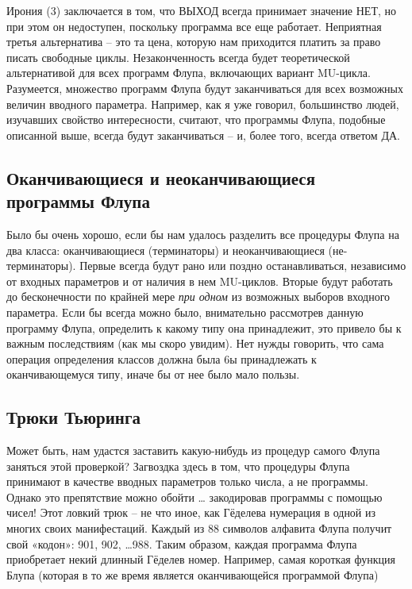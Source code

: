 \documentclass[../main.tex]{subfiles}
\begin{document}
Ирония (3) заключается в том, что ВЫХОД всегда принимает значение НЕТ, но при этом он недоступен, поскольку программа все еще работает. Неприятная третья альтернатива \--- это та цена, которую нам приходится платить за право писать свободные циклы. Незаконченность всегда будет теоретической альтернативой для всех программ Флупа, включающих вариант MU-цикла. Разумеется, множество программ Флупа будут заканчиваться для всех возможных величин вводного параметра. Например, как я уже говорил, большинство людей, изучавших свойство интересности, считают, что программы Флупа, подобные описанной выше, всегда будут заканчиваться \--- и, более того, всегда ответом ДА.


\subsection{Оканчивающиеся и неоканчивающиеся программы Флупа}

Было бы очень хорошо, если бы нам удалось разделить все процедуры Флупа на два класса: оканчивающиеся (терминаторы) и неоканчивающиеся (не-терминаторы). Первые всегда будут рано или поздно останавливаться, независимо от входных параметров и от наличия в нем MU-циклов. Вторые будут работать до бесконечности по крайней мере \emph{при одном} из возможных выборов входного параметра. Если бы всегда можно было, внимательно рассмотрев данную программу Флупа, определить к какому типу она принадлежит, это привело бы к важным последствиям (как мы скоро увидим). Нет нужды говорить, что сама операция определения классов должна была 6ы принадлежать к оканчивающемуся типу, иначе бы от нее было мало пользы.


\subsection{Трюки Тьюринга}

Может быть, нам удастся заставить какую-нибудь из процедур самого Флупа заняться этой проверкой? Загвоздка здесь в том, что процедуры Флупа принимают в качестве вводных параметров только числа, а не программы. Однако это препятствие можно обойти \ldots{} закодировав программы с помощью чисел! Этот ловкий трюк \--- не что иное, как Гёделева нумерация в одной из многих своих манифестаций. Каждый из 88 символов алфавита Флупа получит свой «кодон»: 901, 902, \ldots988. Таким образом, каждая программа Флупа приобретает некий длинный Гёделев номер. Например, самая короткая функция Блупа (которая в то же время является оканчивающейся программой Флупа)
\end{document}
